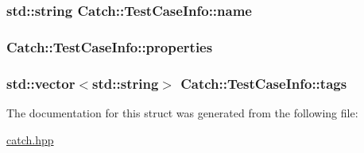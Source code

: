 \hypertarget{struct_catch_1_1_test_case_info_a463794e2f5cfead307c93efd134ade36}{
\subsubsection[{name}]{\setlength{\rightskip}{0pt plus 5cm}std\-::string Catch\-::\-Test\-Case\-Info\-::name}}\label{struct_catch_1_1_test_case_info_a463794e2f5cfead307c93efd134ade36}
\hypertarget{struct_catch_1_1_test_case_info_afc1e84bd7a2e180895a06d9131302af0}{
\subsubsection[{properties}]{ Catch\-::\-Test\-Case\-Info\-::properties}}\label{struct_catch_1_1_test_case_info_afc1e84bd7a2e180895a06d9131302af0}
\hypertarget{struct_catch_1_1_test_case_info_a150a7cbca1dd0c91799ccb14ff822eb0}{
\subsubsection[{tags}]{\setlength{\rightskip}{0pt plus 5cm}std\-::vector$<$std\-::string$>$ Catch\-::\-Test\-Case\-Info\-::tags}}\label{struct_catch_1_1_test_case_info_a150a7cbca1dd0c91799ccb14ff822eb0}


The documentation for this struct was generated from the following file\-:\begin{DoxyCompactItemize}
\item 
\hyperlink{catch_8hpp}{catch.\-hpp}\end{DoxyCompactItemize}
